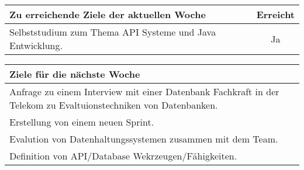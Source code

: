 \begin{tabularx}{\textwidth}{Xc}
    \arrayrulecolor{OliveGreen}
    \toprule
    {\bfseries Zu erreichende Ziele der aktuellen Woche} & {\bfseries Erreicht} \\
    \midrule[2pt]
    Selbststudium zum Thema API Systeme und Java Entwicklung.                   &Ja                    \\
    \bottomrule[2pt]
\end{tabularx}
%
\vspace{1cm}
%
\begin{tabularx}{\textwidth}{Xc}
    \arrayrulecolor{OliveGreen}
    \toprule
    {\bfseries Ziele für die nächste Woche}              &                      \\
    \midrule[2pt]
    Anfrage zu einem Interview mit einer Datenbank Fachkraft in der
    Telekom zu Evaltuionstechniken von Datenbanken.  &  \\
    \rowcolor{OliveGreen!15}
    Erstellung von einem neuen Sprint.  &  \\
    \rowcolor{White}
    Evalution von Datenhaltungssystemen zusammen mit dem Team.  &  \\
    \rowcolor{OliveGreen!15}
    Definition von API/Database Wekrzeugen/Fähigkeiten.  &  \\
\end{tabularx}
